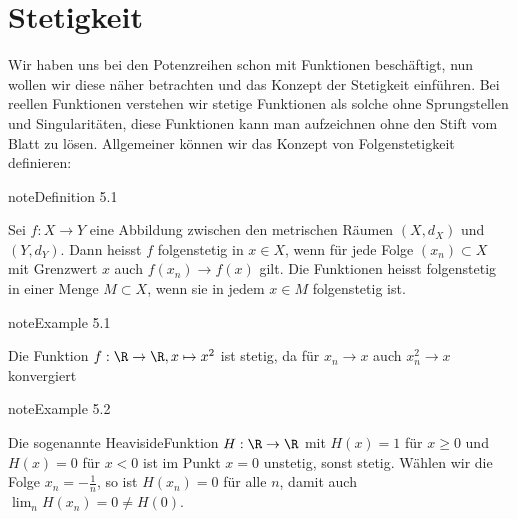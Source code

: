 \documentclass[letterpaper,10pt,english]{jupyterBook}
\begin{document}
\chapter{Stetigkeit}
\label{\detokenize{stetigkeit/stetigkeit:stetigkeit}}\label{\detokenize{stetigkeit/stetigkeit::doc}}
Wir haben uns bei den Potenzreihen schon mit Funktionen beschäftigt, nun wollen wir diese näher betrachten und das Konzept der Stetigkeit einführen. Bei reellen Funktionen verstehen wir stetige Funktionen als solche ohne Sprungstellen und Singularitäten, diese Funktionen kann man aufzeichnen ohne den Stift vom Blatt zu lösen. Allgemeiner können wir das Konzept von Folgenstetigkeit definieren:
\label{stetigkeit/stetigkeit:definition-0}
\begin{sphinxadmonition}{note}{Definition 5.1}



Sei \(f: X \rightarrow Y\) eine Abbildung zwischen den metrischen Räumen \((X,d_X)\) und \((Y,d_Y)\). Dann heisst \(f\) folgenstetig in \(x \in X\), wenn für jede Folge \((x_n) \subset X\) mit Grenzwert \(x\) auch \(f(x_n) \rightarrow f(x)\) gilt. Die Funktionen heisst folgenstetig in einer Menge \(M \subset X\), wenn sie in jedem \(x \in M\) folgenstetig ist.
\end{sphinxadmonition}
\label{stetigkeit/stetigkeit:example-1}
\begin{sphinxadmonition}{note}{Example 5.1}



Die Funktion \(f: \R \rightarrow \R, x \mapsto x^2\) ist stetig, da für \(x_n \rightarrow x\) auch \(x_n^2 \rightarrow x\) konvergiert
\end{sphinxadmonition}
\label{stetigkeit/stetigkeit:example-2}
\begin{sphinxadmonition}{note}{Example 5.2}



Die sogenannte Heaviside\sphinxhyphen{}Funktion \(H: \R \rightarrow \R\) mit \(H(x) = 1\) für \(x \geq 0\) und \(H(x)=0\) für \(x < 0\) ist im Punkt \(x =0\) unstetig, sonst stetig. Wählen wir die Folge \(x_n = -\frac{1}n\), so ist \(H(x_n) = 0\) für alle \(n\), damit auch \(\lim_n H(x_n) = 0 \neq H(0)\).
\end{sphinxadmonition}
\end{document}
